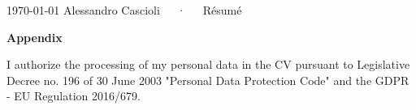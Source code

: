 \documentclass[11pt, a4paper]{awesome-cv}
\begin{document}
\makecvheader[C]

\makecvfooter
{\today}
{Alessandro Cascioli~~~·~~~Résumé}
{\thepage}


% 







\newpage
{}
{\fontsize{24pt}{1em}\selectfont\bfseries\color{darktext} Appendix}







\vfill %

\begin{cvparagraph}
  I authorize the processing of my personal data in the CV pursuant to Legislative Decree no. 196 of 30 June 2003 "Personal Data Protection Code" and the GDPR - EU Regulation 2016/679.
  \vspace{1cm}
\end{cvparagraph}


\end{document}
